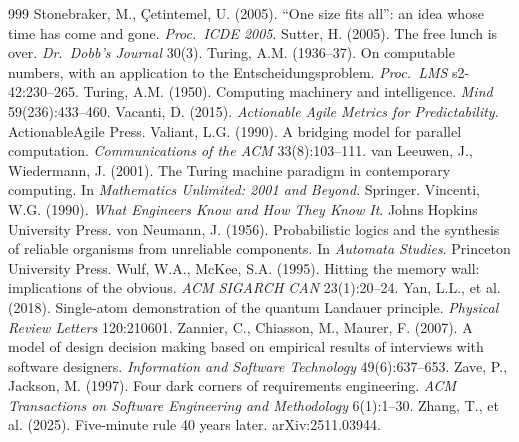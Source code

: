 \documentclass[11pt,oneside]{article}
\theoremstyle{definition}
\theoremstyle{remark}
\begin{document}
\begin{thebibliography}{999}
 Stonebraker, M., \c{C}etintemel, U. (2005). ``One size fits all'': an idea whose time has come and gone. \emph{Proc.\ ICDE 2005}.
 Sutter, H. (2005). The free lunch is over. \emph{Dr.\ Dobb's Journal} 30(3).
 Turing, A.M. (1936--37). On computable numbers, with an application to the Entscheidungsproblem. \emph{Proc.\ LMS} s2-42:230--265.
 Turing, A.M. (1950). Computing machinery and intelligence. \emph{Mind} 59(236):433--460.
 Vacanti, D. (2015). \emph{Actionable Agile Metrics for Predictability}. ActionableAgile Press.
 Valiant, L.G. (1990). A bridging model for parallel computation. \emph{Communications of the ACM} 33(8):103--111.
 van Leeuwen, J., Wiedermann, J. (2001). The Turing machine paradigm in contemporary computing. In \emph{Mathematics Unlimited: 2001 and Beyond}. Springer.
 Vincenti, W.G. (1990). \emph{What Engineers Know and How They Know It}. Johns Hopkins University Press.
 von Neumann, J. (1956). Probabilistic logics and the synthesis of reliable organisms from unreliable components. In \emph{Automata Studies}. Princeton University Press.
 Wulf, W.A., McKee, S.A. (1995). Hitting the memory wall: implications of the obvious. \emph{ACM SIGARCH CAN} 23(1):20--24.
 Yan, L.L., et al. (2018). Single-atom demonstration of the quantum Landauer principle. \emph{Physical Review Letters} 120:210601.
 Zannier, C., Chiasson, M., Maurer, F. (2007). A model of design decision making based on empirical results of interviews with software designers. \emph{Information and Software Technology} 49(6):637--653.
 Zave, P., Jackson, M. (1997). Four dark corners of requirements engineering. \emph{ACM Transactions on Software Engineering and Methodology} 6(1):1--30.
 Zhang, T., et al. (2025). Five-minute rule 40 years later. arXiv:2511.03944.
\end{thebibliography}
\end{document}
